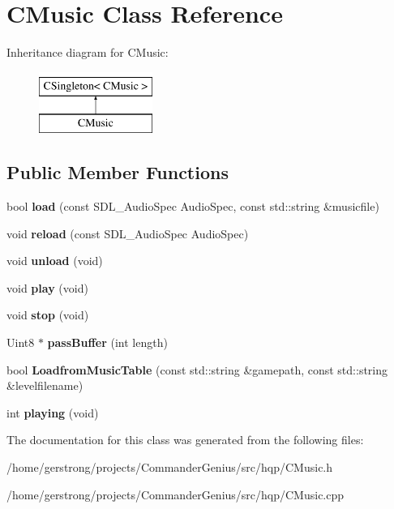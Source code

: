 \hypertarget{class_c_music}{
\section{CMusic Class Reference}
\label{class_c_music}
}
Inheritance diagram for CMusic:\begin{figure}[H]
\begin{center}
\leavevmode
\includegraphics[height=2cm]{class_c_music}
\end{center}
\end{figure}
\subsection*{Public Member Functions}
\begin{DoxyCompactItemize}
\item 
\hypertarget{class_c_music_ae09550ae4a7859cc5ddc1a4e98ef6714}{
bool {\bfseries load} (const SDL\_\-AudioSpec AudioSpec, const std::string \&musicfile)}
\label{class_c_music_ae09550ae4a7859cc5ddc1a4e98ef6714}

\item 
\hypertarget{class_c_music_a3884438e231a9ab3141b58798678ad9c}{
void {\bfseries reload} (const SDL\_\-AudioSpec AudioSpec)}
\label{class_c_music_a3884438e231a9ab3141b58798678ad9c}

\item 
\hypertarget{class_c_music_a8580161b9f9b6470f90ae5a8a30c04ae}{
void {\bfseries unload} (void)}
\label{class_c_music_a8580161b9f9b6470f90ae5a8a30c04ae}

\item 
\hypertarget{class_c_music_acbf1de67db1e71d862120e7aa4f5d99a}{
void {\bfseries play} (void)}
\label{class_c_music_acbf1de67db1e71d862120e7aa4f5d99a}

\item 
\hypertarget{class_c_music_a44bef3125266c47053e02359caab6a7b}{
void {\bfseries stop} (void)}
\label{class_c_music_a44bef3125266c47053e02359caab6a7b}

\item 
\hypertarget{class_c_music_a5803c53e01abe5e456b127860fda4804}{
Uint8 $\ast$ {\bfseries passBuffer} (int length)}
\label{class_c_music_a5803c53e01abe5e456b127860fda4804}

\item 
\hypertarget{class_c_music_a45958c712706579eceb3e08ed778f5cc}{
bool {\bfseries LoadfromMusicTable} (const std::string \&gamepath, const std::string \&levelfilename)}
\label{class_c_music_a45958c712706579eceb3e08ed778f5cc}

\item 
\hypertarget{class_c_music_a741870238a0ae64e9473394334ed89b3}{
int {\bfseries playing} (void)}
\label{class_c_music_a741870238a0ae64e9473394334ed89b3}

\end{DoxyCompactItemize}


The documentation for this class was generated from the following files:\begin{DoxyCompactItemize}
\item 
/home/gerstrong/projects/CommanderGenius/src/hqp/CMusic.h\item 
/home/gerstrong/projects/CommanderGenius/src/hqp/CMusic.cpp\end{DoxyCompactItemize}

